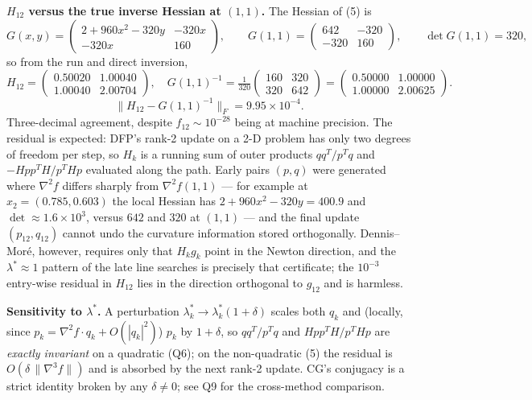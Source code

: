 \documentclass[11pt,a4paper]{article}
\begin{document}
\textbf{\(H_{12}\) versus the true inverse Hessian at \((1,1)\).}
The Hessian of (5) is
\[
G(x,y)=\begin{pmatrix}2+960x^{2}-320y & -320x\\ -320x & 160\end{pmatrix},\qquad G(1,1)=\begin{pmatrix}642 & -320\\ -320 & 160\end{pmatrix},\qquad \det G(1,1)=320,
\]
so from the run and direct inversion,
\[
H_{12}=\begin{pmatrix}0.50020 & 1.00040\\ 1.00040 & 2.00704\end{pmatrix},
\quad
G(1,1)^{-1}=\tfrac{1}{320}\begin{pmatrix}160 & 320\\ 320 & 642\end{pmatrix}=\begin{pmatrix}0.50000 & 1.00000\\ 1.00000 & 2.00625\end{pmatrix}.
\]
\[
\bigl\|H_{12}-G(1,1)^{-1}\bigr\|_{F}=9.95\!\times\!10^{-4}.
\]
Three-decimal agreement, despite \(f_{12}\sim 10^{-28}\) being at machine precision. The residual is expected: DFP's rank-2 update on a 2-D problem has only two degrees of freedom per step, so \(H_k\) is a running sum of outer products \(qq^{T}/p^{T}q\) and \(-Hpp^{T}H/p^{T}Hp\) evaluated along the path. Early pairs \((p,q)\) were generated where \(\nabla^{2}f\) differs sharply from \(\nabla^{2}f(1,1)\) --- for example at \(x_{2}=(0.785,0.603)\) the local Hessian has \(2+960x^{2}-320y=400.9\) and \(\det\approx 1.6\!\times\!10^{3}\), versus \(642\) and \(320\) at \((1,1)\) --- and the final update \((p_{12},q_{12})\) cannot undo the curvature information stored orthogonally. Dennis--Mor\'e, however, requires only that \(H_k g_k\) point in the Newton direction, and the \(\lambda^{\ast}\!\approx\!1\) pattern of the late line searches is precisely that certificate; the \(10^{-3}\) entry-wise residual in \(H_{12}\) lies in the direction orthogonal to \(g_{12}\) and is harmless.

\textbf{Sensitivity to \(\lambda^{\ast}\).}
A perturbation \(\lambda_k^{\ast}\to\lambda_k^{\ast}(1+\delta)\) scales both \(q_k\) and (locally, since \(p_k=\nabla^{2}f\cdot q_k+O(|q_k|^{2})\)) \(p_k\) by \(1+\delta\), so \(qq^{T}/p^{T}q\) and \(Hpp^{T}H/p^{T}Hp\) are \emph{exactly invariant} on a quadratic (Q6); on the non-quadratic (5) the residual is \(O(\delta\,\|\nabla^{3}f\|)\) and is absorbed by the next rank-2 update. CG's conjugacy is a strict identity broken by any \(\delta\neq 0\); see Q9 for the cross-method comparison.
\end{document}
